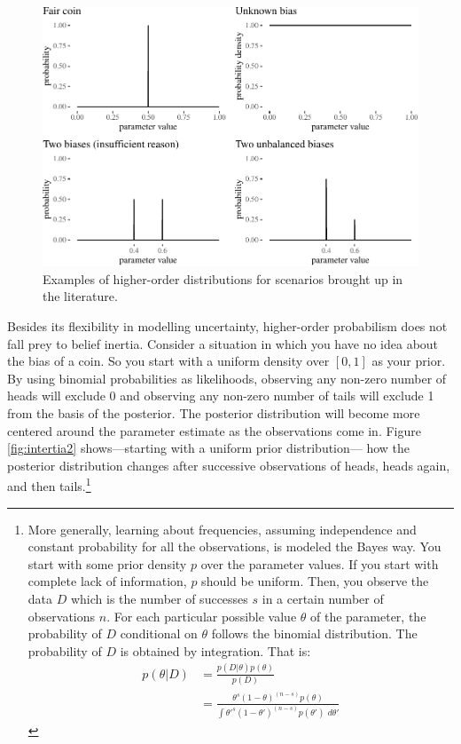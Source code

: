 \documentclass[
  10pt,
  dvipsnames,enabledeprecatedfontcommands]{scrartcl}
\begin{document}
\begin{figure}[t]

\begin{center}\includegraphics[width=1\linewidth]{chapter-outline_files/figure-latex/fig:evidenceResponse2-1} \end{center}
\caption{Examples of higher-order distributions for scenarios brought up in the literature.}
\label{fig:evidenceResponse}
\end{figure}

Besides its flexibility in modelling uncertainty, higher-order
probabilism does not fall prey to belief inertia. Consider a situation
in which you have no idea about the bias of a coin. So you start with a
uniform density over \([0,1]\) as your prior. By using binomial
probabilities as likelihoods, observing any non-zero number of heads
will exclude 0 and observing any non-zero number of tails will exclude 1
from the basis of the posterior. The posterior distribution will become
more centered around the parameter estimate as the observations come in.
Figure \ref{fig:intertia2} shows---starting with a uniform prior
distribution--- how the posterior distribution changes after successive
observations of heads, heads again, and then tails.\footnote{More
  generally, learning about frequencies, assuming independence and
  constant probability for all the observations, is modeled the Bayes
  way. You start with some prior density \(p\) over the parameter
  values. If you start with complete lack of information, \(p\) should
  be uniform. Then, you observe the data \(D\) which is the number of
  successes \(s\) in a certain number of observations \(n\). For each
  particular possible value \(\theta\) of the parameter, the probability
  of \(D\) conditional on \(\theta\) follows the binomial distribution.
  The probability of \(D\) is obtained by integration. That is:
  \begin{align*}
  p(\theta \vert D) & = \frac{p(D\vert \theta)p(\theta)}{p(D)}\\
  & = \frac{\theta^s (1-\theta)^{(n - s)}p(\theta)}{\int \theta'^s (1-\theta')^{(n - s)}p(\theta')\,\, d\theta'}
  \end{align*}}
\end{document}
